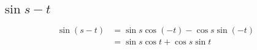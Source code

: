 \documentclass{exam}
\begin{document}
  \subsection{$\sin{s - t}$}
  \begin{align*}
    \sin(s - t) & = \sin s \cos (-t) - \cos s \sin (-t) \\
                & = \sin s \cos t + \cos s \sin t \\
  \end{align*}
\end{document}
